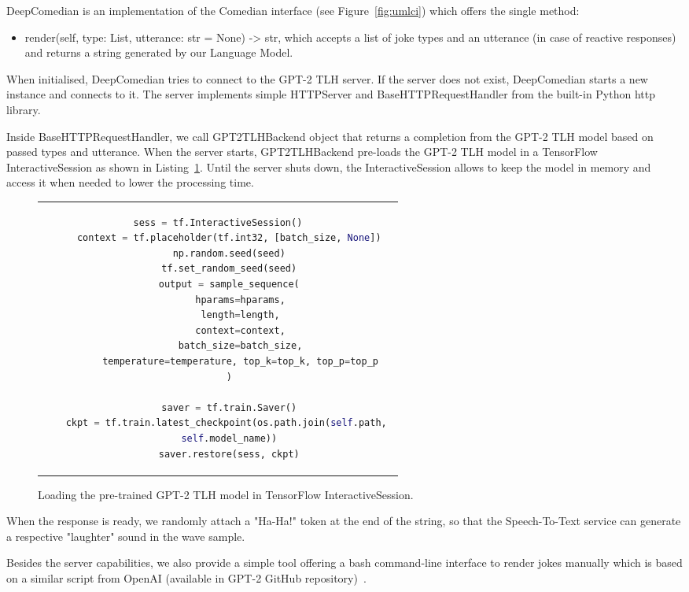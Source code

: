 DeepComedian is an implementation of the Comedian interface (see Figure~\ref{fig:umlci}) which offers the single method:
\begin{itemize}
    \item render(self, type: List, utterance: str = None) -> str, which accepts a list of joke types and an utterance (in case of reactive responses) and returns a string generated by our Language Model.
\end{itemize}

When initialised, DeepComedian tries to connect to the GPT-2 TLH server. If the server does not exist, DeepComedian starts a new instance and connects to it. The server implements simple HTTPServer and BaseHTTPRequestHandler from the built-in Python http library.

Inside BaseHTTPRequestHandler, we call GPT2TLHBackend object that returns a completion from the GPT-2 TLH model based on passed types and utterance. When the server starts, GPT2TLHBackend pre-loads the GPT-2 TLH model in a TensorFlow InteractiveSession as shown in Listing~\ref{fig:tfinteractive}. Until the server shuts down, the InteractiveSession allows to keep the model in memory and access it when needed to lower the processing time.

\begin{figure}[htpb]
  \centering
  \begin{tabular}{c}
  \begin{lstlisting}[language=python]
    sess = tf.InteractiveSession()
    context = tf.placeholder(tf.int32, [batch_size, None])
    np.random.seed(seed)
    tf.set_random_seed(seed)
    output = sample_sequence(
        hparams=hparams,
        length=length,
        context=context,
        batch_size=batch_size,
        temperature=temperature, top_k=top_k, top_p=top_p
    )

    saver = tf.train.Saver()
    ckpt = tf.train.latest_checkpoint(os.path.join(self.path, 
    self.model_name))
    saver.restore(sess, ckpt)
  \end{lstlisting}
  \end{tabular}
  \caption{Loading the pre-trained GPT-2 TLH model in TensorFlow InteractiveSession.}\label{fig:tfinteractive}
\end{figure}

When the response is ready, we randomly attach a "Ha-Ha!" token at the end of the string, so that the Speech-To-Text service can generate a respective "laughter" sound in the wave sample.

Besides the server capabilities, we also provide a simple tool offering a bash command-line interface to render jokes manually which is based on a similar script from OpenAI (available in GPT-2 GitHub repository)~\parencite{gpt2}.

